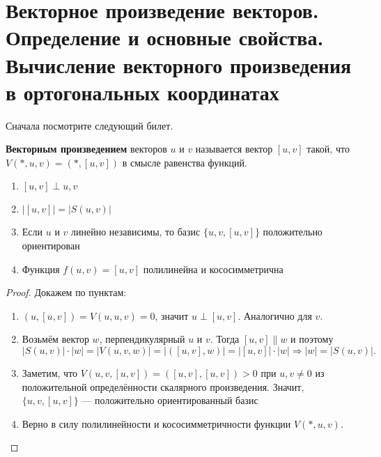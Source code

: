 \section{Векторное произведение векторов. Определение и основные свойства. Вычисление векторного произведения в ортогональных координатах}

Сначала посмотрите следующий билет.

\begin{definition}
    \textbf{Векторным произведением} векторов $u$ и $v$ называется вектор $[u, v]$ такой\footnotemark, что $V(\ast, u, v) = (\ast, [u, v])$ в смысле равенства функций. 
\end{definition}


\begin{lemma}
    \begin{enumerate}
        \item $[u, v] \perp u, v$
        \item $\left|[u, v]\right| = |S(u, v)|$
        \item Если $u$ и $v$ линейно независимы, то базис $\{u, v, [u, v]\}$ положительно ориентирован
        \item Функция $f(u, v) = [u, v]$ полилинейна и кососимметрична
    \end{enumerate}
\end{lemma}

\begin{proof}
    Докажем по пунктам:
    \begin{enumerate}
        \item $(u, [u, v]) = V(u, u, v) = 0$, значит $u \perp [u, v]$. Аналогично для $v$.
        \item Возьмём вектор $w$, перпендикулярный $u$ и $v$. Тогда $[u, v] \parallel w$ и поэтому
            $$|S(u, v)| \cdot |w| = |V(u, v, w)| = |([u, v], w)| = |[u, v]|\cdot|w| \Rightarrow |w| = |S(u, v)|.$$
        \item Заметим, что $V(u, v, [u, v]) = ([u, v], [u, v]) > 0$ при $u, v \ne 0$ из положительной определённости скалярного произведения. Значит, $\{u, v, [u, v]\}$ --- положительно ориентированный базис
        \item Верно в силу полилинейности и кососимметричности функции $V(\ast, u, v)$.
    \end{enumerate}
\end{proof}

